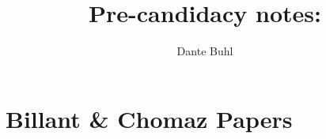 \documentclass{article}
\begin{document}
\title{Pre-candidacy notes: }
\author{Dante Buhl}

\newcommand{\wrms}{w_{\text{rms}}}
\newcommand{\bs}[1]{\boldsymbol{#1}}
\newcommand{\tb}[1]{\textbf{#1}}
\newcommand{\bmp}[1]{\begin{minipage}{#1\textwidth}}
\newcommand{\emp}{\end{minipage}}
\newcommand{\R}{\mathbb{R}}
\newcommand{\C}{\mathbb{C}}
\newcommand{\N}{\mathcal{N}}
\newcommand{\K}{\bs{\mathrm{K}}}
\newcommand{\m}{\bs{\mu}_*}
\newcommand{\s}{\bs{\Sigma}_*}
\newcommand{\dt}{\Delta t}
\newcommand{\dx}{\Delta x}
\newcommand{\tr}[1]{\text{Tr}(#1)}
\newcommand{\Tr}[1]{\text{Tr}(#1)}
\newcommand{\Div}{\nabla \cdot}
\renewcommand{\div}{\nabla \cdot}
\newcommand{\Curl}{\nabla \times}
\newcommand{\Grad}{\nabla}
\newcommand{\grad}{\nabla}
\newcommand{\grads}{\nabla_s}
\newcommand{\gradf}{\nabla_f}
\newcommand{\xs}{x_s}
\newcommand{\xf}{x_f}
\newcommand{\ts}{t_s}
\newcommand{\tf}{t_f}
\newcommand{\pt}{\partial t}
\newcommand{\pz}{\partial z}
\newcommand{\uvec}{\bs{u}}
\newcommand{\F}{\bs{F}}
\newcommand{\T}{\tilde{T}}
\newcommand{\ez}{\bs{e}_z}
\newcommand{\ex}{\bs{e}_x}
\newcommand{\ey}{\bs{e}_y}
\newcommand{\eo}{\bs{e}_{\bs{\Omega}}}
\newcommand{\ppt}[1]{\frac{\partial #1}{\partial t}}
\newcommand{\DDt}[1]{\frac{D #1}{D t}}
\newcommand{\ppts}[1]{\frac{\partial #1}{\partial t_s}}
\newcommand{\pptf}[1]{\frac{\partial #1}{\partial t_f}}
\newcommand{\ppz}[1]{\frac{\partial #1}{\partial z}}
\newcommand{\ddz}[1]{\frac{d #1}{d z}}
\newcommand{\ppzetas}[1]{\frac{\partial^2 #1}{\partial \zeta^2}}
\newcommand{\ppzs}[1]{\frac{\partial #1}{\partial z_s}}
\newcommand{\ppzf}[1]{\frac{\partial #1}{\partial z_f}}
\newcommand{\ppx}[1]{\frac{\partial #1}{\partial x}}
\newcommand{\ppxi}[1]{\frac{\partial #1}{\partial x_i}}
\newcommand{\ppxj}[1]{\frac{\partial #1}{\partial x_j}}
\newcommand{\ppy}[1]{\frac{\partial #1}{\partial y}}
\newcommand{\ppzeta}[1]{\frac{\partial #1}{\partial \zeta}}


\maketitle 
\tableofcontents
\pagebreak
\setlength{\parindent}{0pt}

\section{Billant \& Chomaz Papers}
\end{document}
